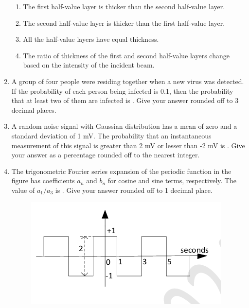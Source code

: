 \documentclass[a4paper,12pt]{exam}
\numberwithin{equation}{enumi}
\numberwithin{figure}{enumi}
\begin{document}
\begin{enumerate}
\hfill{}

\begin{enumerate}
\item The first half-value layer is thicker than the second half-value layer.
\item The second half-value layer is thicker than the first half-value layer. 
\item All the half-value layers have equal thickness.
\item The ratio of thickness of the first and second half-value layers change based on the   intensity of the incident beam.
\end{enumerate}  

\item A group of four people were residing together when a new virus was detected. If  the probability of each person being infected is 0.1, then the probability that at least two of them are infected is \underline{\hspace{0.75cm}}. Give your answer rounded off to 3 decimal places. 

\hfill{}

\item A random noise signal with Gaussian distribution has a mean of zero and a standard  deviation of 1 mV. The probability that an instantaneous measurement of this signal is greater than 2 mV or lesser than -2 mV is \underline{\hspace{1cm}}. Give your answer as a percentage rounded off to the nearest integer.

\hfill{}

\item The trigonometric Fourier series expansion of the periodic function in the figure has coefficients {$a_n$} and {$b_n$} for cosine and sine terms, respectively. The value of  
$a_1/a_3$ is \underline{\hspace{1.2cm}}. Give your answer rounded off to 1 decimal place.  

\begin{figure}[H]
\hspace{1.5cm}
\includegraphics[width=0.5\columwidth]{figs/Q30.png}
\label{fig:Q30.png}
\end{figure}


\end{enumerate}
\end{document}
